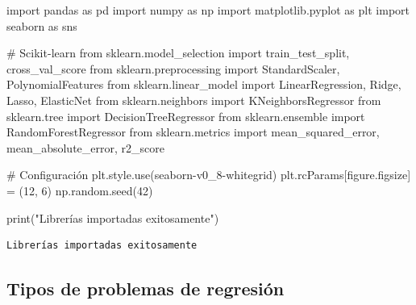 \documentclass[
  doc,
  floatsintext,
  longtable,
  a4paper,
  nolmodern,
  notxfonts,
  notimes,
  12pt,
  colorlinks=true,linkcolor=blue,citecolor=blue,urlcolor=blue]{apa7}
\newenvironment{Shaded}{\begin{snugshade}}{\end{snugshade}}
\newcommand{\BuiltInTok}[1]{\textcolor[rgb]{0.00,0.23,0.31}{#1}}
\newcommand{\CommentTok}[1]{\textcolor[rgb]{0.37,0.37,0.37}{#1}}
\newcommand{\DecValTok}[1]{\textcolor[rgb]{0.68,0.00,0.00}{#1}}
\newcommand{\ImportTok}[1]{\textcolor[rgb]{0.00,0.46,0.62}{#1}}
\newcommand{\NormalTok}[1]{\textcolor[rgb]{0.00,0.23,0.31}{#1}}
\newcommand{\OperatorTok}[1]{\textcolor[rgb]{0.37,0.37,0.37}{#1}}
\newcommand{\StringTok}[1]{\textcolor[rgb]{0.13,0.47,0.30}{#1}}
\begin{document}
\begin{Shaded}
\begin{Highlighting}[]
\ImportTok{import}\NormalTok{ pandas }\ImportTok{as}\NormalTok{ pd}
\ImportTok{import}\NormalTok{ numpy }\ImportTok{as}\NormalTok{ np}
\ImportTok{import}\NormalTok{ matplotlib.pyplot }\ImportTok{as}\NormalTok{ plt}
\ImportTok{import}\NormalTok{ seaborn }\ImportTok{as}\NormalTok{ sns}

\CommentTok{\# Scikit{-}learn}
\ImportTok{from}\NormalTok{ sklearn.model\_selection }\ImportTok{import}\NormalTok{ train\_test\_split, cross\_val\_score}
\ImportTok{from}\NormalTok{ sklearn.preprocessing }\ImportTok{import}\NormalTok{ StandardScaler, PolynomialFeatures}
\ImportTok{from}\NormalTok{ sklearn.linear\_model }\ImportTok{import}\NormalTok{ LinearRegression, Ridge, Lasso, ElasticNet}
\ImportTok{from}\NormalTok{ sklearn.neighbors }\ImportTok{import}\NormalTok{ KNeighborsRegressor}
\ImportTok{from}\NormalTok{ sklearn.tree }\ImportTok{import}\NormalTok{ DecisionTreeRegressor}
\ImportTok{from}\NormalTok{ sklearn.ensemble }\ImportTok{import}\NormalTok{ RandomForestRegressor}
\ImportTok{from}\NormalTok{ sklearn.metrics }\ImportTok{import}\NormalTok{ mean\_squared\_error, mean\_absolute\_error, r2\_score}

\CommentTok{\# Configuración}
\NormalTok{plt.style.use(}\StringTok{\textquotesingle{}seaborn{-}v0\_8{-}whitegrid\textquotesingle{}}\NormalTok{)}
\NormalTok{plt.rcParams[}\StringTok{\textquotesingle{}figure.figsize\textquotesingle{}}\NormalTok{] }\OperatorTok{=}\NormalTok{ (}\DecValTok{12}\NormalTok{, }\DecValTok{6}\NormalTok{)}
\NormalTok{np.random.seed(}\DecValTok{42}\NormalTok{)}

\BuiltInTok{print}\NormalTok{(}\StringTok{"Librerías importadas exitosamente"}\NormalTok{)}
\end{Highlighting}
\end{Shaded}

\begin{verbatim}
Librerías importadas exitosamente
\end{verbatim}

\subsection{Tipos de problemas de
regresión}\label{tipos-de-problemas-de-regresiuxf3n}
\end{document}

